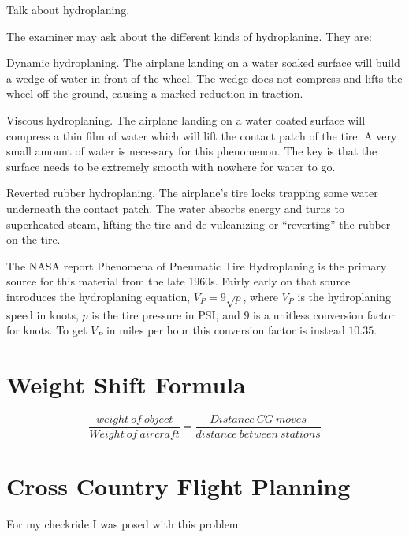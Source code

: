 Talk about hydroplaning.

The examiner may ask about the different kinds of hydroplaning. They are:

Dynamic hydroplaning. The airplane landing on a water soaked surface will build a wedge of water in front of the wheel. The wedge does not compress and lifts the wheel off the ground, causing a marked reduction in traction.

Viscous hydroplaning. The airplane landing on a water coated surface will compress a thin film of water which will lift the contact patch of the tire. A very small amount of water is necessary for this phenomenon. The key is that the surface needs to be extremely smooth with nowhere for water to go.

Reverted rubber hydroplaning. The airplane's tire locks trapping some water underneath the contact patch. The water absorbs energy and turns to superheated steam, lifting the tire and de-vulcanizing or ``reverting'' the rubber on the tire.

The NASA report Phenomena of Pneumatic Tire Hydroplaning \cite{hydroplaning} is the primary source for this material from the late 1960s. Fairly early on that source introduces the hydroplaning equation, $V_P = 9 \sqrt{p}$, where $V_P$ is the hydroplaning speed in knots, $p$ is the tire pressure in PSI, and $9$ is a unitless conversion factor for knots. To get $V_P$ in miles per hour this conversion factor is instead $10.35$.

\section{Weight Shift Formula}

\begin{equation}
    \frac{weight\ of\ object}{Weight\ of\ aircraft} = \frac{Distance\ CG\ moves}{distance\ between\ stations}
\end{equation}

\section{Cross Country Flight Planning}

For my checkride I was posed with this problem:

